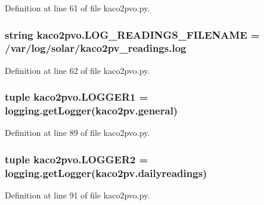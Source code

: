 Definition at line 61 of file kaco2pvo.\+py.

\hypertarget{namespacekaco2pvo_adc1024bae951cf0139b81e6ea62a9416}{}
\subsubsection[{L\+O\+G\+\_\+\+R\+E\+A\+D\+I\+N\+G\+S\+\_\+\+F\+I\+L\+E\+N\+A\+M\+E}]{\setlength{\rightskip}{0pt plus 5cm}string kaco2pvo.\+L\+O\+G\+\_\+\+R\+E\+A\+D\+I\+N\+G\+S\+\_\+\+F\+I\+L\+E\+N\+A\+M\+E = \textquotesingle{}/var/log/solar/kaco2pv\+\_\+readings.\+log\textquotesingle{}}\label{namespacekaco2pvo_adc1024bae951cf0139b81e6ea62a9416}


Definition at line 62 of file kaco2pvo.\+py.

\hypertarget{namespacekaco2pvo_acc657a067d1fb3fab2e8a4215bc2fbb0}{}
\subsubsection[{L\+O\+G\+G\+E\+R1}]{\setlength{\rightskip}{0pt plus 5cm}tuple kaco2pvo.\+L\+O\+G\+G\+E\+R1 = logging.\+get\+Logger(\textquotesingle{}kaco2pv.\+general\textquotesingle{})}\label{namespacekaco2pvo_acc657a067d1fb3fab2e8a4215bc2fbb0}


Definition at line 89 of file kaco2pvo.\+py.

\hypertarget{namespacekaco2pvo_a582f5f9563f2851ddad564ea4dfc173e}{}
\subsubsection[{L\+O\+G\+G\+E\+R2}]{\setlength{\rightskip}{0pt plus 5cm}tuple kaco2pvo.\+L\+O\+G\+G\+E\+R2 = logging.\+get\+Logger(\textquotesingle{}kaco2pv.\+dailyreadings\textquotesingle{})}\label{namespacekaco2pvo_a582f5f9563f2851ddad564ea4dfc173e}


Definition at line 91 of file kaco2pvo.\+py.

\hypertarget{namespacekaco2pvo_ae935d61a481e99111efe2ed1db9bd027}{}
